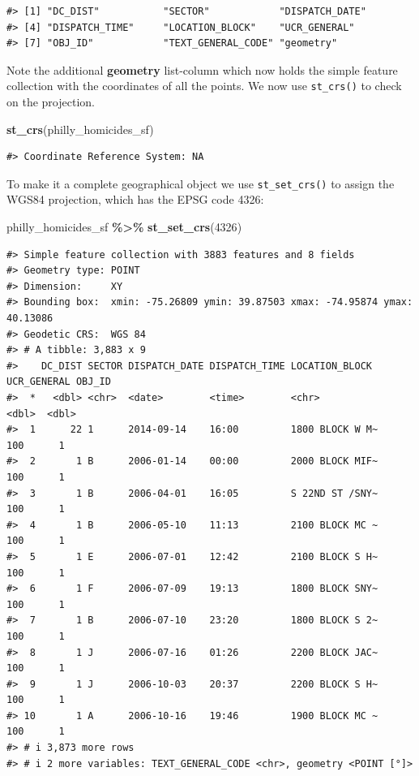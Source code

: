 \documentclass[
]{book}
\newenvironment{Shaded}{\begin{snugshade}}{\end{snugshade}}
\newcommand{\DecValTok}[1]{\textcolor[rgb]{0.00,0.00,0.81}{#1}}
\newcommand{\FunctionTok}[1]{\textcolor[rgb]{0.13,0.29,0.53}{\textbf{#1}}}
\newcommand{\NormalTok}[1]{#1}
\newcommand{\SpecialCharTok}[1]{\textcolor[rgb]{0.81,0.36,0.00}{\textbf{#1}}}
\begin{document}
\begin{verbatim}
#> [1] "DC_DIST"           "SECTOR"            "DISPATCH_DATE"    
#> [4] "DISPATCH_TIME"     "LOCATION_BLOCK"    "UCR_GENERAL"      
#> [7] "OBJ_ID"            "TEXT_GENERAL_CODE" "geometry"
\end{verbatim}

Note the additional \textbf{geometry} list-column which now holds the simple feature collection with the coordinates of all the points. We now use \texttt{st\_crs()} to check on the projection.

\begin{Shaded}
\begin{Highlighting}[]
\FunctionTok{st\_crs}\NormalTok{(philly\_homicides\_sf)}
\end{Highlighting}
\end{Shaded}

\begin{verbatim}
#> Coordinate Reference System: NA
\end{verbatim}

To make it a complete geographical object we use \texttt{st\_set\_crs()} to assign the WGS84 projection, which has the EPSG code 4326:

\begin{Shaded}
\begin{Highlighting}[]
\NormalTok{philly\_homicides\_sf }\SpecialCharTok{\%\textgreater{}\%} \FunctionTok{st\_set\_crs}\NormalTok{(}\DecValTok{4326}\NormalTok{)}
\end{Highlighting}
\end{Shaded}

\begin{verbatim}
#> Simple feature collection with 3883 features and 8 fields
#> Geometry type: POINT
#> Dimension:     XY
#> Bounding box:  xmin: -75.26809 ymin: 39.87503 xmax: -74.95874 ymax: 40.13086
#> Geodetic CRS:  WGS 84
#> # A tibble: 3,883 x 9
#>    DC_DIST SECTOR DISPATCH_DATE DISPATCH_TIME LOCATION_BLOCK  UCR_GENERAL OBJ_ID
#>  *   <dbl> <chr>  <date>        <time>        <chr>                 <dbl>  <dbl>
#>  1      22 1      2014-09-14    16:00         1800 BLOCK W M~         100      1
#>  2       1 B      2006-01-14    00:00         2000 BLOCK MIF~         100      1
#>  3       1 B      2006-04-01    16:05         S 22ND ST /SNY~         100      1
#>  4       1 B      2006-05-10    11:13         2100 BLOCK MC ~         100      1
#>  5       1 E      2006-07-01    12:42         2100 BLOCK S H~         100      1
#>  6       1 F      2006-07-09    19:13         1800 BLOCK SNY~         100      1
#>  7       1 B      2006-07-10    23:20         1800 BLOCK S 2~         100      1
#>  8       1 J      2006-07-16    01:26         2200 BLOCK JAC~         100      1
#>  9       1 J      2006-10-03    20:37         2200 BLOCK S H~         100      1
#> 10       1 A      2006-10-16    19:46         1900 BLOCK MC ~         100      1
#> # i 3,873 more rows
#> # i 2 more variables: TEXT_GENERAL_CODE <chr>, geometry <POINT [°]>
\end{verbatim}
\end{document}
